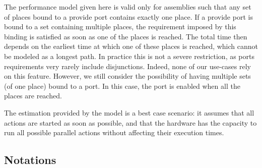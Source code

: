 The performance model given here is valid only for assemblies such
that any set of places bound to a provide port contains exactly one
place. If a provide port is bound to a set containing multiple
places, the requirement imposed by this binding is satisfied as soon
as one of the places is reached. The total time then depends on the
earliest time at which one of these places is reached, which cannot be
modeled as a longest path. In practice this is not a severe
restriction, as ports requirements very rarely include
disjunctions. Indeed, none of our use-cases rely on this
feature. However, we still consider the possibility of having multiple
sets (of one place) bound to a port. In this case, the port is enabled
when all the places are reached.


The estimation provided by the model is a best case scenario: it
assumes that all actions are started as soon as possible, and that the
hardware has the capacity to run all possible parallel actions without
affecting their execution times.

\subsection{Notations}



